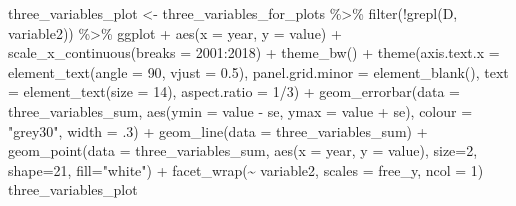 \documentclass[10pt,landscape,a3paper]{article}
\newenvironment{Shaded}{\begin{snugshade}}{\end{snugshade}}
\newcommand{\AttributeTok}[1]{\textcolor[rgb]{0.77,0.63,0.00}{#1}}
\newcommand{\DecValTok}[1]{\textcolor[rgb]{0.00,0.00,0.81}{#1}}
\newcommand{\FloatTok}[1]{\textcolor[rgb]{0.00,0.00,0.81}{#1}}
\newcommand{\FunctionTok}[1]{\textcolor[rgb]{0.00,0.00,0.00}{#1}}
\newcommand{\NormalTok}[1]{#1}
\newcommand{\OtherTok}[1]{\textcolor[rgb]{0.56,0.35,0.01}{#1}}
\newcommand{\SpecialCharTok}[1]{\textcolor[rgb]{0.00,0.00,0.00}{#1}}
\newcommand{\StringTok}[1]{\textcolor[rgb]{0.31,0.60,0.02}{#1}}
\begin{document}
\begin{Shaded}
\begin{Highlighting}[]
\NormalTok{three\_variables\_plot }\OtherTok{\textless{}{-}}\NormalTok{ three\_variables\_for\_plots }\SpecialCharTok{\%\textgreater{}\%}
  \FunctionTok{filter}\NormalTok{(}\SpecialCharTok{!}\FunctionTok{grepl}\NormalTok{(}\StringTok{\textquotesingle{}D\textquotesingle{}}\NormalTok{, variable2)) }\SpecialCharTok{\%\textgreater{}\%} 
\NormalTok{  ggplot }\SpecialCharTok{+} \FunctionTok{aes}\NormalTok{(}\AttributeTok{x =}\NormalTok{ year, }\AttributeTok{y =}\NormalTok{ value) }\SpecialCharTok{+}
  \FunctionTok{scale\_x\_continuous}\NormalTok{(}\AttributeTok{breaks =} \DecValTok{2001}\SpecialCharTok{:}\DecValTok{2018}\NormalTok{) }\SpecialCharTok{+} 
  \FunctionTok{theme\_bw}\NormalTok{() }\SpecialCharTok{+}
  \FunctionTok{theme}\NormalTok{(}\AttributeTok{axis.text.x =} \FunctionTok{element\_text}\NormalTok{(}\AttributeTok{angle =} \DecValTok{90}\NormalTok{, }\AttributeTok{vjust =} \FloatTok{0.5}\NormalTok{), }\AttributeTok{panel.grid.minor =} \FunctionTok{element\_blank}\NormalTok{(),}
        \AttributeTok{text =} \FunctionTok{element\_text}\NormalTok{(}\AttributeTok{size =} \DecValTok{14}\NormalTok{), }\AttributeTok{aspect.ratio =} \DecValTok{1}\SpecialCharTok{/}\DecValTok{3}\NormalTok{) }\SpecialCharTok{+}
  \FunctionTok{geom\_errorbar}\NormalTok{(}\AttributeTok{data =}\NormalTok{ three\_variables\_sum, }\FunctionTok{aes}\NormalTok{(}\AttributeTok{ymin =}\NormalTok{ value }\SpecialCharTok{{-}}\NormalTok{ se, }\AttributeTok{ymax =}\NormalTok{ value }\SpecialCharTok{+}\NormalTok{ se), }\AttributeTok{colour =} \StringTok{"grey30"}\NormalTok{, }\AttributeTok{width =}\NormalTok{ .}\DecValTok{3}\NormalTok{) }\SpecialCharTok{+}
  \FunctionTok{geom\_line}\NormalTok{(}\AttributeTok{data =}\NormalTok{ three\_variables\_sum) }\SpecialCharTok{+}
  \FunctionTok{geom\_point}\NormalTok{(}\AttributeTok{data =}\NormalTok{ three\_variables\_sum, }\FunctionTok{aes}\NormalTok{(}\AttributeTok{x =}\NormalTok{ year, }\AttributeTok{y =}\NormalTok{ value), }\AttributeTok{size=}\DecValTok{2}\NormalTok{, }\AttributeTok{shape=}\DecValTok{21}\NormalTok{, }\AttributeTok{fill=}\StringTok{"white"}\NormalTok{) }\SpecialCharTok{+}
  \FunctionTok{facet\_wrap}\NormalTok{(}\SpecialCharTok{\textasciitilde{}}\NormalTok{ variable2, }\AttributeTok{scales =} \StringTok{\textquotesingle{}free\_y\textquotesingle{}}\NormalTok{, }\AttributeTok{ncol =} \DecValTok{1}\NormalTok{)}
\NormalTok{three\_variables\_plot}
\end{Highlighting}
\end{Shaded}
\end{document}
